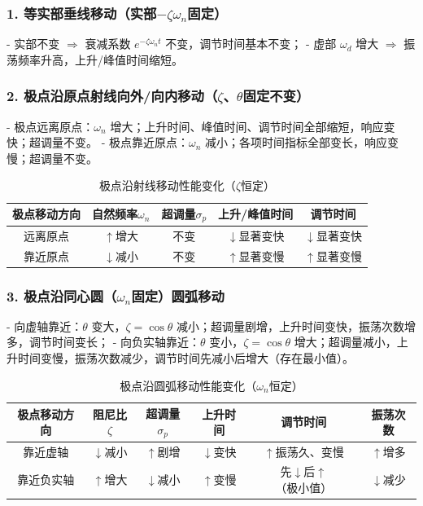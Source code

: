 \subsubsection{1. 等实部垂线移动（实部$-\zeta\omega_n$固定）}
- 实部不变 $\Rightarrow$ 衰减系数 $e^{-\zeta\omega_n t}$ 不变，调节时间基本不变；
- 虚部 $\omega_d$ 增大 $\Rightarrow$ 振荡频率升高，上升/峰值时间缩短。

\subsubsection{2. 极点沿原点射线向外/向内移动（$\zeta$、$\theta$固定不变）}
- 极点远离原点：$\omega_n$ 增大；上升时间、峰值时间、调节时间全部缩短，响应变快；超调量不变。
- 极点靠近原点：$\omega_n$ 减小；各项时间指标全部变长，响应变慢；超调量不变。

\begin{table}[htbp]
\centering
\caption{极点沿射线移动性能变化（$\zeta$恒定）}
\begin{tabular}{ccccc}
\toprule
极点移动方向 & 自然频率$\omega_n$ & 超调量$\sigma_p$ & 上升/峰值时间 & 调节时间 \\
\midrule
远离原点 & $\uparrow$增大 & 不变 & $\downarrow$显著变快 & $\downarrow$显著变快 \\
靠近原点 & $\downarrow$减小 & 不变 & $\uparrow$显著变慢 & $\uparrow$显著变慢 \\
\bottomrule
\end{tabular}
\end{table}

\subsubsection{3. 极点沿同心圆（$\omega_n$固定）圆弧移动}
- 向虚轴靠近：$\theta$ 变大，$\zeta=\cos\theta$ 减小；超调量剧增，上升时间变快，振荡次数增多，调节时间变长；
- 向负实轴靠近：$\theta$ 变小，$\zeta=\cos\theta$ 增大；超调量减小，上升时间变慢，振荡次数减少，调节时间先减小后增大（存在最小值）。

\begin{table}[htbp]
\centering
\caption{极点沿圆弧移动性能变化（$\omega_n$恒定）}
\begin{tabular}{cccccc}
\toprule
极点移动方向 & 阻尼比$\zeta$ & 超调量$\sigma_p$ & 上升时间 & 调节时间 & 振荡次数 \\
\midrule
靠近虚轴 & $\downarrow$减小 & $\uparrow$剧增 & $\downarrow$变快 & $\uparrow$振荡久、变慢 & $\uparrow$增多 \\
靠近负实轴 & $\uparrow$增大 & $\downarrow$减小 & $\uparrow$变慢 & 先$\downarrow$后$\uparrow$（极小值） & $\downarrow$减少 \\
\bottomrule
\end{tabular}
\end{table}

\bigskip

\setlength{\parskip}{0pt plus 1pt}
\renewcommand{\arraystretch}{1}
\setlength{\tabcolsep}{6pt}
